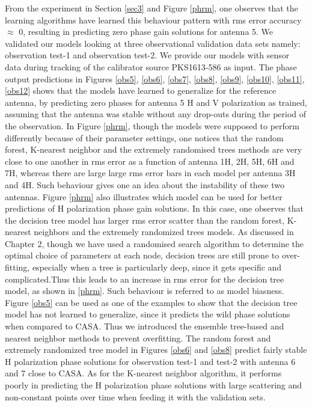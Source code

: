 From the experiment in Section \ref{sec3} and Figure \ref{phrm}, one observes that the learning algorithms have learned this behaviour pattern with rms error accuracy $\approx$ 0, resulting in predicting zero phase gain solutions for antenna 5. We validated our models looking at three observational validation data sets namely: observation test-1 and observation test-2. We provide our models with sensor data during tracking of the calibrator source PKS1613-586 as input. The phase output predictions in Figures \ref{obs5}, \ref{obs6}, \ref{obs7}, \ref{obs8}, \ref{obs9}, \ref{obs10}, \ref{obs11}, \ref{obs12}  shows that the models have learned to generalize for the reference antenna, by predicting zero phases for antenna 5 H and V polarization as trained, assuming that the antenna was stable without any drop-outs during the period of the observation. In Figure \ref{phrm}, though the models were supposed to perform differently because of their parameter settings, one notices that the random forest, K-nearest neighbor and the extremely randomised trees methods are very close to one another in rms error as a function of antenna 1H, 2H, 5H, 6H and 7H, whereas there are large large rms error bars in each model per antenna 3H and 4H. Such behaviour gives one an idea about the instability of these two antennas. Figure \ref{phrm} also illustrates which model can be used for better predictions of H polarization phase gain solutions. In this case, one observes that the decision tree model has larger rms error scatter than the random forest, K-nearest neighbors and the extremely randomized trees models. As discussed in Chapter 2, though we have used a randomised search algorithm to determine the optimal choice of parameters at each node, decision trees are still prone to over-fitting, especially when a tree is particularly deep, since it gets specific and complicated.Thus this leads to an increase in rms error for the decision tree model, as shown in \ref{phrm}. Such behaviour is referred to as model biasness. Figure \ref{obs5} can be used as one of the examples to show that the decision tree model has not learned to generalize, since it predicts the wild phase solutions when compared to CASA. Thus we introduced the ensemble tree-based and nearest neighbor methods to prevent overfitting. The random forest and extremely randomized tree model in Figures \ref{obs6} and \ref{obs8} predict fairly stable H polarization phase solutions for observation test-1 and test-2 with antenna 6 and 7 close to CASA. As for the K-nearest neighbor algorithm, it performs poorly in predicting the H polarization phase solutions with large scattering and non-constant points over time when feeding it with the validation sets. 
  
